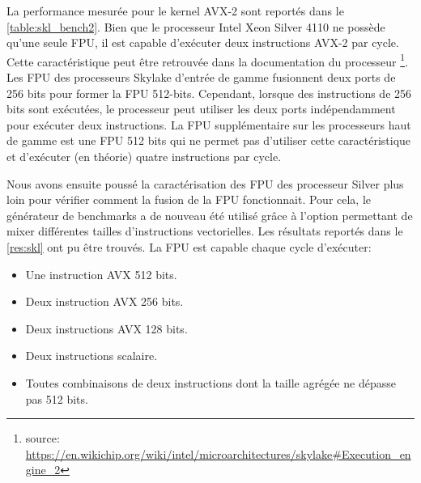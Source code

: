         La performance mesurée pour le kernel AVX-2 sont reportés dans le \autoref{table:skl_bench2}.  Bien que le processeur Intel Xeon Silver 4110 ne possède qu'une seule FPU, il est capable d'exécuter deux instructions AVX-2 par cycle. Cette caractéristique peut être retrouvée dans la documentation du processeur \footnote{source: \url{https://en.wikichip.org/wiki/intel/microarchitectures/skylake\#Execution_engine_2}}. Les FPU des processeurs Skylake d'entrée de gamme fusionnent deux ports de 256 bits pour former la FPU 512-bits. Cependant, lorsque des instructions de 256 bits sont exécutées, le processeur peut utiliser les deux ports indépendamment pour exécuter deux instructions. La FPU supplémentaire sur les processeurs haut de gamme est une FPU 512 bits qui ne permet pas d'utiliser cette caractéristique et d'exécuter (en théorie) quatre instructions par cycle. 

        Nous avons ensuite poussé la caractérisation des FPU des processeur Silver plus loin pour vérifier comment la fusion de la FPU fonctionnait. Pour cela, le générateur de benchmarks a de nouveau été utilisé grâce à l'option permettant de mixer différentes tailles d'instructions vectorielles. Les résultats reportés dans le \autoref{res:skl} ont pu être trouvés. La FPU est capable chaque cycle d'exécuter: 


        \begin{itemize}
            \item Une instruction AVX 512 bits.
            \item Deux instruction AVX 256 bits.
            \item Deux instructions AVX 128 bits.
            \item Deux instructions scalaire.
            \item Toutes combinaisons de deux instructions dont la taille agrégée ne dépasse pas 512 bits.
        \end{itemize}
        
